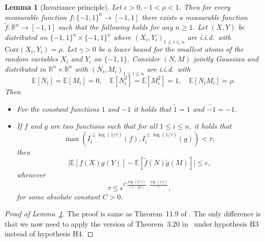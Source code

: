 \documentclass[11pt]{amsart}
\newcommand{\R}{\mathbb{R}}
\newcommand{\E}{\mathbb{E}}
\newcommand{\eps}{\epsilon}
\newcommand{\1}{\mathbf{1}}
\def\R{{\mathbb R}}
\def\E{{\mathbb E}}
\theoremstyle{definition}
\theoremstyle{plain}
\newtheorem{lemma}[example]{Lemma}
\theoremstyle{remark}
\numberwithin{equation}{section}
\begin{document}
\begin{lemma}[Invariance principle] \label{thm:invariance}
Let $\eps >0, -1 < \rho < 1$.
Then for every measurable function $f : \{-1,1\}^n \to [-1,1]$ there exists a measurable function $\widetilde{f} : \R^n \to [-1,1]$ such that the following holds for any $n \ge 1$.
Let  $(X,Y)$ be distributed on $\{-1,1\}^n \times \{-1,1\}^n$ where $(X_i,Y_i)_{ 1 \le i \le n}$ are i.i.d.\  with
$\mathrm{Corr}(X_i ,Y_i) = \rho.$
Let $\gamma>0$ be a lower bound for the smallest atoms of the random variables $X_i$ and $Y_i$ on $\{-1, 1\}$.
Consider $(N,M)$ jointly Gaussian and distributed in $\mathbb R^n \times \R^n$ with $(N_i,M_i)_{ 1 \le i \le n}$ are i.i.d.\  with
\[
\E[N_i] = \E[M_i] = 0, \quad \E[N_i^2] = \E[M_i^2] = 1, \quad \E[N_i M_i] = \rho.
\]
Then
\begin{itemize}
\item
For the constant functions $1$ and $-1$ it holds that $\widetilde{1} = 1$ and $\widetilde{ -1} = -1$.
\item
If $f$ and $g$ are two functions such that for all $1 \le i \le n$, it holds that \[ \max(I_i^{\le \log(1/\tau)}(f),I_i^{\le \log(1/\tau)}(g)) < \tau, \] then
\begin{equation} \label{eq:inv}
\big|\E[f(X) g(Y)] - \E[\widetilde{f}(N) \widetilde{g}(M)] \big| \leq \eps,
\end{equation}
whenever
\begin{equation} \label{eq:tau_bound}
\tau \leq \eps^{C \frac{ \log(2/\gamma)}{(1-|\rho|)} \cdot \frac{\log(1/\eps)}{\eps}},
\end{equation}
for some absolute constant $C>0$.
\end{itemize}
\end{lemma}
\begin{proof}[Proof of Lemma~\ref{thm:invariance}]
The proof is same as Theorem~11.9 of \cite{Mossel11}. The only difference is that we now need to apply the version of Theorem~3.20 in~\cite{MoOdOl:10} under hypothesis H3 instead of hypothesis H4.
\end{proof}
\end{document}
